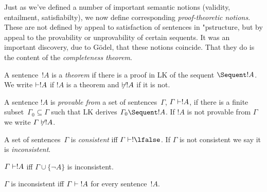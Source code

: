 \documentclass[../../include/open-logic-section]{subfiles}
\begin{document}

\begin{explain}
Just as we've defined a number of important semantic notions
(validity, entailment, satisfiabilty), we now define corresponding
\emph{proof-theoretic notions}. These are not defined by appeal to
satisfaction of sentences in "p{structure}, but by appeal to the
provability or unprovability of certain sequents.  It was an important
discovery, due to G\"odel, that these notions coincide.  That they do
is the content of the \emph{completeness theorem}.
\end{explain}

\begin{defn}[Theorems]
A sentence~$!A$ is a \emph{theorem} if there is a proof in LK of the
sequent $\Sequent !A$. We write $\Proves !A$ if $!A$ is a theorem and
$\Proves/ !A$ if it is not.
\end{defn}

\begin{defn}[Provability]
A sentence $!A$ is \emph{provable from} a set of sentences~$\Gamma$,
$\Gamma \Proves !A$, if there is a finite subset~$\Gamma_0 \subseteq
\Gamma$ such that LK derives $\Gamma_0 \Sequent !A$.  If $!A$ is not
provable from $\Gamma$ we write $\Gamma \Proves/ !A$.
\end{defn}

\begin{defn}[Consistency]
A set of sentences~$\Gamma$ is \emph{consistent} iff $\Gamma \Proves!
\lfalse$.  If $\Gamma$ is not consistent we say it is \emph{inconsistent}.
\end{defn}

\begin{prop}
$\Gamma \Proves !A$ iff $\Gamma \cup \{\lnot A\}$ is inconsistent.
\end{prop}

\begin{prop}
$\Gamma$ is inconsistent iff $\Gamma \Proves {!A}$ for every sentence~$!A$.
\end{prop}
\end{document}
